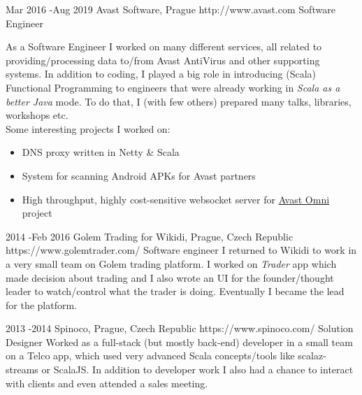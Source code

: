 \documentclass[10pt]{article} %
\begin{document}

    \job
    {Mar 2016 -}{Aug 2019}
    {Avast Software, Prague}
    {http://www.avast.com}
    {Software Engineer}
    {As a Software Engineer I worked on many different services, all related to providing/processing data to/from Avast AntiVirus and other supporting systems. In addition to coding,
        I played a big role in introducing (Scala) Functional Programming to engineers that were already working in \emph{Scala as a better Java} mode.
    To do that, I (with few others) prepared many talks, libraries, workshops etc. \\ Some interesting projects I worked on:
        \begin{itemize}
            \item DNS proxy written in Netty \& Scala
            \item System for scanning Android APKs for Avast partners
            \item High throughput, highly cost-sensitive websocket server for \href{https://www.avast.com/en-us/omni}{Avast Omni} project
        \end{itemize}

        }


    \job
    {2014 -}{Feb 2016}
    {Golem Trading for Wikidi, Prague, Czech Republic}
    {https://www.golemtrader.com/}
    {Software engineer}
    {I returned to Wikidi to work in a very small team on Golem trading platform. I worked on \emph{Trader} app which made decision about trading and I also wrote an UI for the founder/thought leader to watch/control what the trader is doing. Eventually I became the lead for the platform. \\
    }


    \job
    {2013 -}{2014 }
    {Spinoco, Prague, Czech Republic}
    {https://www.spinoco.com/}
    {Solution Designer}
    {Worked as a full-stack (but mostly back-end) developer in a small team on a Telco app, which used very advanced Scala concepts/tools like scalaz-streams or ScalaJS. In addition to developer work I also had a chance to interact with clients and even attended a sales meeting.\\
    }
\end{document}
